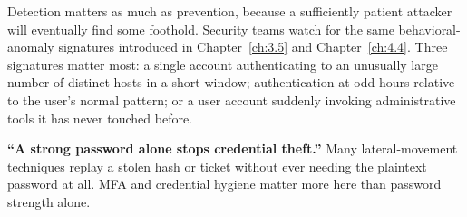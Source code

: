 Detection matters as much as prevention, because a sufficiently patient attacker will eventually
find some foothold. Security teams watch for the same behavioral-anomaly signatures introduced in
Chapter~\ref{ch:3.5} and Chapter~\ref{ch:4.4}. Three signatures matter most: a single account
authenticating to an unusually large number of distinct hosts in a short window; authentication at
odd hours relative to the user's normal pattern; or a user account suddenly invoking administrative
tools it has never touched before.

\begin{misconception}
\textbf{``A strong password alone stops credential theft.''} Many lateral-movement techniques
replay a stolen hash or ticket without ever needing the plaintext password at all. MFA and
credential hygiene matter more here than password strength alone.
\end{misconception}

